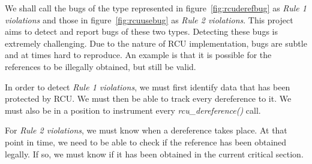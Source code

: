 We shall call the bugs of the type represented in figure~\ref{fig:rcuderefbug} as \emph{Rule 1 violations}
and those in figure~\ref{fig:rcuusebug} as \emph{Rule 2 violations}.
This project aims to detect and report bugs of these two types.
Detecting these bugs is extremely challenging. Due to the nature of RCU implementation,
bugs are subtle and at times hard to reproduce. An example is that it is possible for the
references to be illegally obtained, but still be valid.

In order to detect \emph{Rule 1 violations}, we must first identify data
that has been protected by RCU. We must then be able to track every
dereference to it. We must also be in a position to instrument
every \emph{rcu\_dereference()} call.

For \emph{Rule 2 violations}, we must know when a dereference takes place.
At that point in time, we need to be able to check if the reference has
been obtained legally. If so, we must know if it has been obtained in
the current critical section.





%







